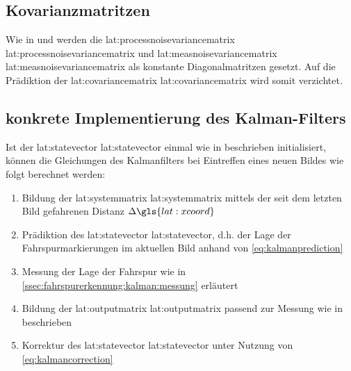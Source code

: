 \subsection{Kovarianzmatritzen}
Wie in \autocite{petersfalkoFPGAbasierteBildverarbeitungspipelineZur2009} und \autocite{risackRobustLaneRecognition} werden die \glsdesc{lat:processnoisevariancematrix} \gls{lat:processnoisevariancematrix} und \glsdesc{lat:measnoisevariancematrix} \gls{lat:measnoisevariancematrix} als konstante Diagonalmatritzen gesetzt. Auf die Prädiktion der \glsdesc{lat:covariancematrix} \gls{lat:covariancematrix} wird somit verzichtet.

\subsection{konkrete Implementierung des Kalman-Filters}
Ist der \glsdesc{lat:statevector} \gls{lat:statevector} einmal wie in \label{sssec:fahrspurerkennung:kalman:fahrspurmodell:initialisierung} beschrieben initialisiert, können die Gleichungen des Kalmanfilters bei Eintreffen eines neuen Bildes wie folgt berechnet werden:
\begin{enumerate}
\item Bildung der \glsdesc{lat:systemmatrix} \gls{lat:systemmatrix} mittels der seit dem letzten Bild gefahrenen Distanz \begin{math} \Delta \gls{lat:xcoord} \end{math}
\item Prädiktion des \glsdesc{lat:statevector} \gls{lat:statevector}, d.h. der Lage der Fahrspurmarkierungen im aktuellen Bild anhand von \eqref{eq:kalmanprediction}
\item Messung der Lage der Fahrspur wie in \ref{ssec:fahrspurerkennung:kalman:messung}
erläutert
\item Bildung der \glsdesc{lat:outputmatrix} \gls{lat:outputmatrix} passend zur Messung wie in \label{sssec:fahrspurerkennung:kalman-filter:zustandsraumbeschreibung:outputmatrix} beschrieben
\item Korrektur des \glsdesc{lat:statevector} \gls{lat:statevector} unter Nutzung von \eqref{eq:kalmancorrection}
\end{enumerate}


